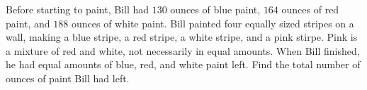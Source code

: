 Before starting to paint, Bill had $ 130$ ounces of blue paint, $ 164$ ounces of red paint, and $ 188$ ounces of white paint. Bill painted four equally sized stripes on a wall, making a blue stripe, a red stripe, a white stripe, and a pink stirpe. Pink is a mixture of red and white, not necessarily in equal amounts. When Bill finished, he had equal amounts of blue, red, and white paint left. Find the total number of ounces of paint Bill had left.